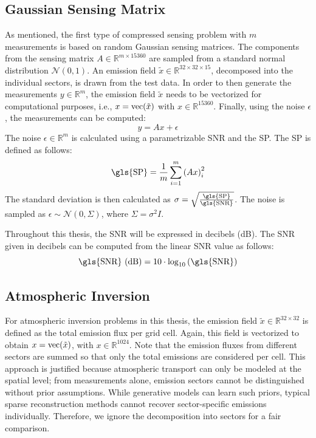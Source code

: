 \subsection{Gaussian Sensing Matrix}
As mentioned, the first type of compressed sensing problem with $m$ measurements is based on random Gaussian sensing matrices.
The components from the sensing matrix $A \in \mathbb{R}^{m \times 15360}$ are sampled from a standard normal distribution $\mathcal{N}(0,1)$.
An emission field $\tilde{x} \in \mathbb{R}^{32 \times 32 \times 15}$, decomposed into the individual sectors, is drawn from the test data.
In order to then generate the measurements $y \in \mathbb{R}^m$, the emission field $\tilde{x}$ needs to be vectorized for computational purposes, i.e., $x = \text{vec}(\tilde{x})$ with $x \in \mathbb{R}^{15360}$.
Finally, using the noise $\epsilon$, the measurements can be computed:
\begin{equation}
    y = A x + \epsilon
\end{equation}
The noise $\epsilon \in \mathbb{R}^m$ is calculated using a parametrizable \gls{SNR} and the \gls{SP}.
The \gls{SP} is defined as follows:
\begin{equation}
    \text{\gls{SP}} = \frac{1}{m}\sum_{i=1}^m{\left(Ax\right)_i^2}
\end{equation}
The standard deviation is then calculated as $\sigma = \sqrt{\frac{\text{\gls{SP}}}{\text{\gls{SNR}}}}$.
The noise is sampled as $\epsilon \sim \mathcal{N}(0, \Sigma)$, where $\Sigma = \sigma^2 I$.

Throughout this thesis, the \gls{SNR} will be expressed in decibels (\unit{dB}).
The \gls{SNR} given in decibels can be computed from the linear \gls{SNR} value as follows:
\begin{equation}
    \text{\gls{SNR} (\unit{dB})} = 10 \cdot \log_{10}\left(\text{\gls{SNR}}\right)
\end{equation}

\subsection{Atmospheric Inversion} \label{subsec:atmospheric_inversion}
For atmospheric inversion problems in this thesis, the emission field $\tilde{x} \in \mathbb{R}^{32 \times 32}$ is defined as the total emission flux per grid cell.
Again, this field is vectorized to obtain $x = \text{vec}(\tilde{x})$, with $x \in \mathbb{R}^{1024}$.
Note that the emission fluxes from different sectors are summed so that only the total emissions are considered per cell.
This approach is justified because atmospheric transport can only be modeled at the spatial level;
from measurements alone, emission sectors cannot be distinguished without prior assumptions.
While generative models can learn such priors, typical sparse reconstruction methods cannot recover sector-specific emissions individually.
Therefore, we ignore the decomposition into sectors for a fair comparison.

